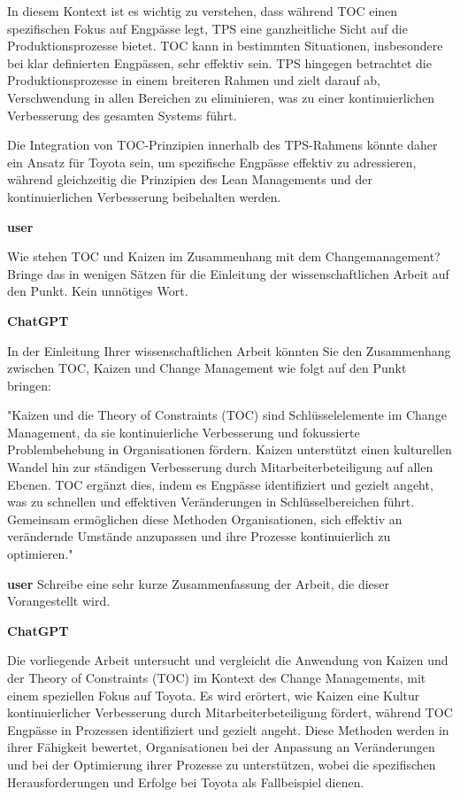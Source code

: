 In diesem Kontext ist es wichtig zu verstehen, dass während TOC einen spezifischen Fokus auf Engpässe legt, TPS eine ganzheitliche Sicht auf die Produktionsprozesse bietet. TOC kann in bestimmten Situationen, insbesondere bei klar definierten Engpässen, sehr effektiv sein. TPS hingegen betrachtet die Produktionsprozesse in einem breiteren Rahmen und zielt darauf ab, Verschwendung in allen Bereichen zu eliminieren, was zu einer kontinuierlichen Verbesserung des gesamten Systems führt. 

Die Integration von TOC-Prinzipien innerhalb des TPS-Rahmens könnte daher ein Ansatz für Toyota sein, um spezifische Engpässe effektiv zu adressieren, während gleichzeitig die Prinzipien des Lean Managements und der kontinuierlichen Verbesserung beibehalten werden.

\textbf{user}

Wie stehen TOC und Kaizen im Zusammenhang mit dem Changemanagement? Bringe das in wenigen Sätzen für die Einleitung der wissenschaftlichen Arbeit auf den Punkt. Kein unnötiges Wort.

\textbf{ChatGPT}
	
In der Einleitung Ihrer wissenschaftlichen Arbeit könnten Sie den Zusammenhang zwischen TOC, Kaizen und Change Management wie folgt auf den Punkt bringen:

"Kaizen und die Theory of Constraints (TOC) sind Schlüsselelemente im Change Management, da sie kontinuierliche Verbesserung und fokussierte Problembehebung in Organisationen fördern. Kaizen unterstützt einen kulturellen Wandel hin zur ständigen Verbesserung durch Mitarbeiterbeteiligung auf allen Ebenen. TOC ergänzt dies, indem es Engpässe identifiziert und gezielt angeht, was zu schnellen und effektiven Veränderungen in Schlüsselbereichen führt. Gemeinsam ermöglichen diese Methoden Organisationen, sich effektiv an verändernde Umstände anzupassen und ihre Prozesse kontinuierlich zu
optimieren."

\textbf{user}
Schreibe eine sehr kurze Zusammenfassung der Arbeit, die dieser Vorangestellt wird.

\textbf{ChatGPT}

Die vorliegende Arbeit untersucht und vergleicht die Anwendung von Kaizen und der Theory of Constraints (TOC) im Kontext des Change Managements, mit einem speziellen Fokus auf Toyota. Es wird erörtert, wie Kaizen eine Kultur kontinuierlicher Verbesserung durch Mitarbeiterbeteiligung fördert, während TOC Engpässe in Prozessen identifiziert und gezielt angeht. Diese Methoden werden in ihrer Fähigkeit bewertet, Organisationen bei der Anpassung an Veränderungen und bei der Optimierung ihrer Prozesse zu unterstützen, wobei die spezifischen Herausforderungen und Erfolge bei Toyota als Fallbeispiel dienen.


